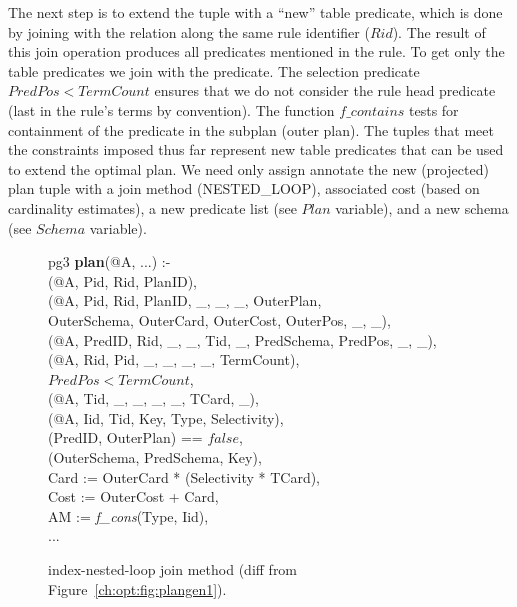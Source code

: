 The next step is to extend the  tuple with a ``new'' table predicate,
which is done by joining with the  relation along the same rule
identifier ($Rid$).  The result of this join operation produces all predicates
mentioned in the rule.  To get only the table predicates we join with the
 predicate.  The selection predicate $PredPos < TermCount$ ensures that
we do not consider the rule head predicate (last in the rule's terms by
convention).  The function $f\_contains$ tests for containment of the predicate
in the subplan (outer plan).  The tuples that meet the constraints imposed thus
far represent new table predicates that can be used to extend the optimal plan.
We need only assign annotate the new (projected) plan tuple with a join method
(NESTED\_LOOP), associated cost (based on cardinality estimates), a new
predicate list (see $Plan$ variable), and a new schema (see $Schema$ variable).

\begin{figure*}
\ssp
\centering
\begin{boxedminipage}{\linewidth}
pg3 {\bf plan}(@A, ...) :-\\
(@A, Pid, Rid, PlanID),\\
(@A, Pid, Rid, PlanID, \_, \_, \_, OuterPlan, \\
\datalogspace \datalogspace OuterSchema, OuterCard, OuterCost, OuterPos, \_, \_),  \\   
(@A, PredID, Rid, \_, \_, Tid, \_, PredSchema, PredPos, \_, \_),\\
(@A, Rid, Pid, \_, \_, \_, \_, TermCount), \\
\datalogspace $PredPos < TermCount$,\\
(@A, Tid, \_, \_, \_, \_, TCard, \_),\\
(@A, Iid, Tid, Key, Type, Selectivity),\\
(PredID, OuterPlan) == $false$,\\
(OuterSchema, PredSchema, Key),\\
\datalogspace Card   := OuterCard * (Selectivity * TCard),\\
\datalogspace Cost   := OuterCost + Card,\\
\datalogspace AM := {\em f\_cons}(Type, Iid),\\
\datalogspace ...
\end{boxedminipage}
\caption{\label{ch:opt:fig:plangen2}index-nested-loop join method (diff from Figure~\ref{ch:opt:fig:plangen1}).}
\end{figure*}

